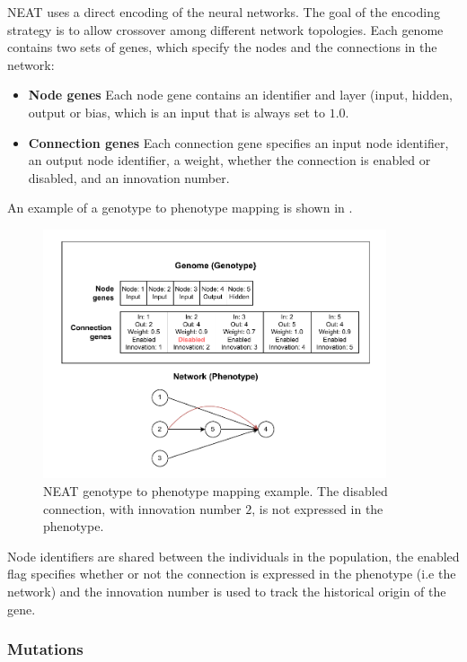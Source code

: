 NEAT uses a direct encoding of the neural networks. The goal of the encoding strategy is to allow crossover among different network topologies.
Each genome contains two sets of genes, which specify the nodes and the connections in the network:

\begin{itemize}
    \item \textbf{Node genes} Each node gene contains an identifier and layer (input, hidden, output or bias, which is an input that is always set to $1.0$.
    \item \textbf{Connection genes} Each connection gene specifies an input node identifier, an output node identifier, a weight, whether the connection is enabled or
        disabled, and an innovation number.
\end{itemize}

An example of a genotype to phenotype mapping is shown in .

\begin{figure}
    \centering
    \includegraphics[width=0.9\textwidth]{Pictures/neat_encoding}
    \caption{NEAT genotype to phenotype mapping example. The disabled connection, with innovation number $2$, is not expressed in the phenotype.}
    \label{fig:neat_genome}
\end{figure}

Node identifiers are shared between the individuals in the population, the enabled flag specifies whether or not the connection is expressed in the phenotype (i.e
the network) and the innovation number is used to track the historical origin of the gene.

\subsubsection{Mutations}

